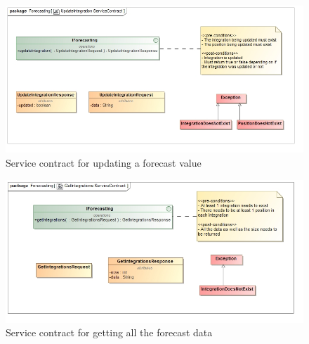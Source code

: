 \documentclass[11pt,a4paper]{article}
\begin{document}
\begin{figure}[H]
	\includegraphics[width=\linewidth]{../Images/UpdateIntegration ServiceContract}
	\caption{Service contract for updating a forecast value}
\end{figure}

\begin{figure}[H]
	\includegraphics[width=\linewidth]{../Images/GetIntegrations ServiceContract}
	\caption{Service contract for getting all the forecast data}
\end{figure}
\end{document}
